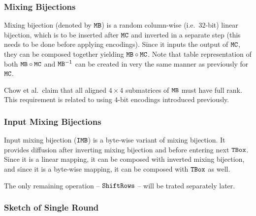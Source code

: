 \subsubsection{Mixing Bijections}
	
	Mixing bijection (denoted by $\texttt{MB}$) is a random column-wise (i.e.\ $32$-bit) linear bijection, which is to be inserted after $\texttt{MC}$ and inverted in a separate step (this needs to be done before applying encodings). Since it inputs the output of $\texttt{MC}$, they can be composed together yielding $\texttt{MB}\circ\texttt{MC}$. Note that table representation of both $\texttt{MB}\circ\texttt{MC}$ and $\texttt{MB}^{-1}$ can be created in very the same manner as previously for $\texttt{MC}$.
	
	\begin{note}
	\label{note:fullrank}
		Chow et al.\ claim that all aligned $4\times4$ submatrices of $\texttt{MB}$ must have full rank. This requirement is related to using $4$-bit encodings introduced previously.
	\end{note}

\subsubsection{Input Mixing Bijections}
	
	Input mixing bijection ($\texttt{IMB}$) is a byte-wise variant of mixing bijection. It provides diffusion after inverting mixing bijection and before entering next $\texttt{TBox}$. Since it is a linear mapping, it can be composed with inverted mixing bijection, and since it is a byte-wise mapping, it can be composed with $\texttt{TBox}$ as well.
	
	The only remaining operation -- $\texttt{ShiftRows}$ -- will be trated separately later.

\subsubsection{Sketch of Single Round}
	
